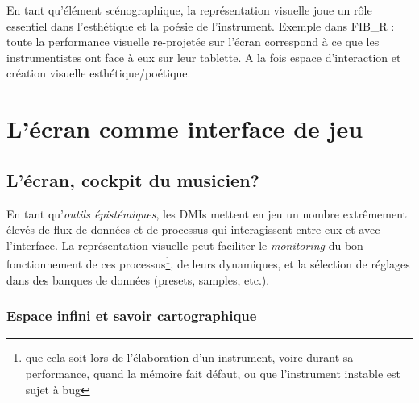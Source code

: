 \noindent En tant qu'élément scénographique, la représentation visuelle joue un rôle essentiel dans l'esthétique et la poésie de l'instrument.
Exemple dans FIB\_R : toute la performance visuelle re-projetée sur l'écran correspond à ce que les instrumentistes ont face à eux sur leur tablette. A la fois espace d'interaction et création visuelle esthétique/poétique.



\section{L'écran comme interface de jeu}

\subsection{L'écran, cockpit du musicien?}

\noindent En tant qu'\textit{outils épistémiques}, les \glspl{DMI} mettent en jeu un nombre extrêmement élevés de flux de données et de processus qui interagissent entre eux et avec l'interface. La représentation visuelle peut faciliter le \textit{monitoring} du bon fonctionnement de ces processus\footnote{que cela soit lors de l'élaboration d'un instrument, voire durant sa performance, quand la mémoire fait défaut, ou que l'instrument instable est sujet à bug}, de leurs dynamiques, et la sélection de réglages dans des banques de données (presets, samples, etc.).

\subsubsection{Espace infini et savoir cartographique} 

